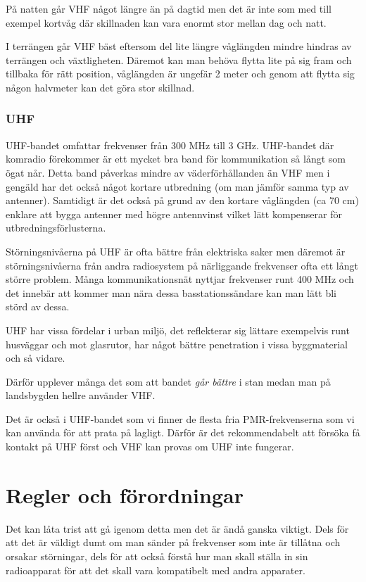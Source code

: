 \documentclass[12ypt,swedish,a4paper]{report}
\begin{document}
På natten går VHF något längre än på dagtid men det är inte som med till exempel kortvåg där skillnaden kan vara enormt stor mellan dag och natt.

I terrängen går VHF bäst eftersom del lite längre våglängden mindre hindras av terrängen och växtligheten. Däremot kan man behöva flytta lite på sig fram och tillbaka för rätt position, våglängden är ungefär 2 meter och genom att flytta sig någon halvmeter kan det göra stor skillnad.

\subsection{UHF}

UHF-bandet omfattar frekvenser från 300 MHz till 3 GHz. UHF-bandet där komradio förekommer är ett mycket bra band för kommunikation så långt som ögat når. Detta band påverkas mindre av väderförhållanden än VHF men i gengäld har det också något kortare utbredning (om man jämför samma typ av antenner). Samtidigt är det också på grund av den kortare våglängden (ca 70 cm) enklare att bygga antenner med högre antennvinst vilket lätt kompenserar för utbredningsförlusterna.

Störningsnivåerna på UHF är ofta bättre från elektriska saker men däremot är störningsnivåerna från andra radiosystem på närliggande frekvenser ofta ett långt större problem. Många kommunikationsnät nyttjar frekvenser runt 400 MHz och det innebär att kommer man nära dessa basstationssändare kan man lätt bli störd av dessa.

UHF har vissa fördelar i urban miljö, det reflekterar sig lättare exempelvis runt husväggar och mot glasrutor, har något bättre penetration i vissa byggmaterial och så vidare.

Därför upplever många det som att bandet \textit{går bättre} i stan medan man på landsbygden hellre använder VHF.

Det är också i UHF-bandet som vi finner de flesta fria PMR-frekvenserna som vi kan använda för att prata på lagligt. Därför är det rekommendabelt att försöka få kontakt på UHF först och VHF kan provas om UHF inte fungerar.

\chapter{Regler och förordningar}

Det kan låta trist att gå igenom detta men det är ändå ganska viktigt. Dels för att det är väldigt dumt om man sänder på frekvenser som inte är tillåtna och orsakar störningar, dels för att också förstå hur man skall ställa in sin radioapparat för att det skall vara kompatibelt med andra apparater.
\end{document}
